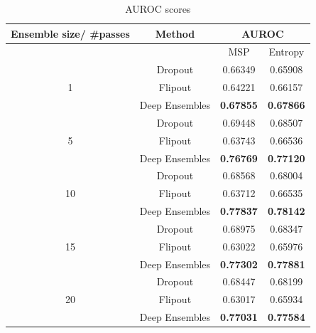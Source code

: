     \begin{table}[h!]
        \centering
        \begin{tabular}{cccc}
        \hline
        Ensemble size/ \#passes & Method               &  \multicolumn{2}{c}{AUROC}          \\ \hline
                                &                      &  MSP             & Entropy          \\ \hline
        \multirow{3}{*}{1}      & Dropout              & 0.66349          & 0.65908          \\
                                & Flipout              & 0.64221          & 0.66157          \\
                                & Deep Ensembles       & \textbf{0.67855} & \textbf{0.67866} \\ \hline
        \multirow{3}{*}{5}      & Dropout              & 0.69448          & 0.68507          \\
                                & Flipout              & 0.63743          & 0.66536          \\
                                & Deep Ensembles       & \textbf{0.76769} & \textbf{0.77120} \\ \hline
        \multirow{3}{*}{10}     & Dropout              & 0.68568          & 0.68004          \\
                                & Flipout              & 0.63712          & 0.66535          \\
                                & Deep Ensembles       & \textbf{0.77837} & \textbf{0.78142} \\ \hline
        \multirow{3}{*}{15}     & Dropout              & 0.68975          & 0.68347          \\
                                & Flipout              & 0.63022           & 0.65976          \\
                                & Deep Ensembles       & \textbf{0.77302} & \textbf{0.77881} \\ \hline
        \multirow{3}{*}{20}     & Dropout              & 0.68447          & 0.68199          \\
                                & Flipout              & 0.63017          & 0.65934          \\
                                & Deep Ensembles       & \textbf{0.77031} & \textbf{0.77584} \\ \hline
        \end{tabular}
        \caption{AUROC scores}
        \label{tab:auroc_ood_2}
    \end{table}
